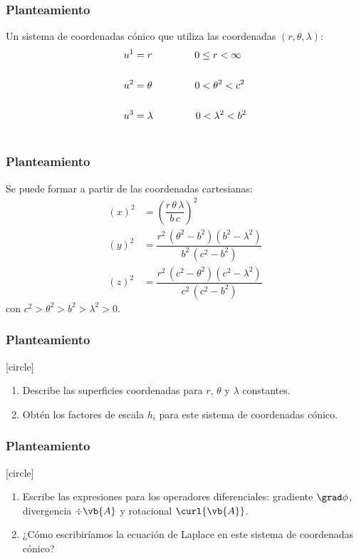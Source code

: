 \begin{frame}
\frametitle{Planteamiento}
Un sistema de coordenadas cónico que utiliza las coordenadas $(r, \theta, \lambda)$:
\begin{align*}
u^{1} &= r \hspace{1.5cm} 0 \leq r < \infty \\[0.5cm]
u^{2} &= \theta \hspace{1.5cm} 0 < \theta^{2} < c^{2} \\[0.5cm]
u^{3} &= \lambda \hspace{1.5cm} 0 < \lambda^{2} < b^{2} \\[0.5cm]
\end{align*}
\end{frame}
\begin{frame}
\frametitle{Planteamiento}
Se puede formar a partir de las coordenadas cartesianas:
\begin{align*}
(x)^{2} &= \left( \dfrac{r \, \theta \, \lambda}{b \, c} \right)^{2} \\[0.5em]
(y)^{2} &= \dfrac{r^{2} \, (\theta^{2} - b^{2})(b^{2} - \lambda^{2})}{b^{2} \, (c^{2} - b^{2})} \\[0.5em]
(z)^{2} &= \dfrac{r^{2} \, (c^{2} - \theta^{2})(c^{2} - \lambda^{2})}{c^{2} \, (c^{2} - b^{2})}
\end{align*}
con $c^{2} > \theta^{2} > b^{2} > \lambda^{2} > 0$.
\end{frame}
\begin{frame}
\frametitle{Planteamiento}
[circle]
\begin{enumerate}[<+->]
\item Describe las superficies coordenadas para $r$, $\theta$ y $\lambda$ constantes.
\item Obtén los factores de escala $h_{i}$ para este sistema de coordenadas cónico.
\seti
\end{enumerate}
\end{frame}
\begin{frame}
\frametitle{Planteamiento}
[circle]
\begin{enumerate}[<+->]
\conti
\item Escribe las expresiones para los operadores diferenciales: gradiente $\grad \phi$, divergencia $\div{\vb{A}}$ y rotacional $\curl{\vb{A}}$.
\item ¿Cómo escribiríamos la ecuación de Laplace en este sistema de coordenadas cónico?
\end{enumerate}
\end{frame}

